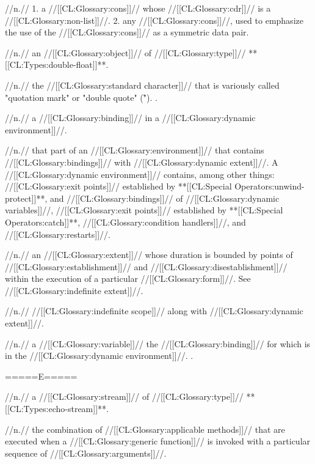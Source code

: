  //n.// 1. a //[[CL:Glossary:cons]]// whose //[[CL:Glossary:cdr]]// is a //[[CL:Glossary:non-list]]//. 2. any //[[CL:Glossary:cons]]//, used to emphasize the use of the //[[CL:Glossary:cons]]// as a symmetric data pair.
 
 //n.// an //[[CL:Glossary:object]]// of //[[CL:Glossary:type]]// **[[CL:Types:double-float]]**.

 //n.// the //[[CL:Glossary:standard character]]// that is variously called "quotation mark" or "double quote" (\f{"}). \Seefigure\StdCharsThree.

 //n.// a //[[CL:Glossary:binding]]// in a //[[CL:Glossary:dynamic environment]]//.

 //n.// that part of an //[[CL:Glossary:environment]]// that contains //[[CL:Glossary:bindings]]// with //[[CL:Glossary:dynamic extent]]//. A //[[CL:Glossary:dynamic environment]]// contains, among other things: //[[CL:Glossary:exit points]]// established by **[[CL:Special Operators:unwind-protect]]**, and //[[CL:Glossary:bindings]]// of //[[CL:Glossary:dynamic variables]]//, //[[CL:Glossary:exit points]]// established by **[[CL:Special Operators:catch]]**, //[[CL:Glossary:condition handlers]]//, and //[[CL:Glossary:restarts]]//. 
 
 //n.// an //[[CL:Glossary:extent]]// whose duration is bounded by points of //[[CL:Glossary:establishment]]// and //[[CL:Glossary:disestablishment]]// within the execution of a particular //[[CL:Glossary:form]]//. See //[[CL:Glossary:indefinite extent]]//. 
 
 //n.// //[[CL:Glossary:indefinite scope]]// along with //[[CL:Glossary:dynamic extent]]//.
 
 //n.// a //[[CL:Glossary:variable]]// the //[[CL:Glossary:binding]]// for which is in the //[[CL:Glossary:dynamic environment]]//. .

=====E=====

 //n.// a //[[CL:Glossary:stream]]// of //[[CL:Glossary:type]]// **[[CL:Types:echo-stream]]**.

 //n.// the combination of //[[CL:Glossary:applicable methods]]// that are executed when a //[[CL:Glossary:generic function]]// is invoked with a particular sequence of //[[CL:Glossary:arguments]]//.
 
